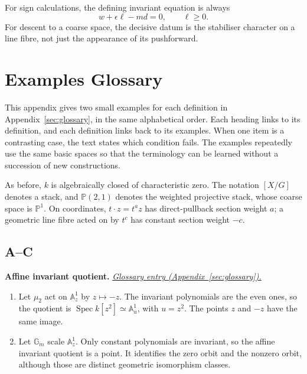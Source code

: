 \documentclass[11pt,a4paper]{article}
\numberwithin{equation}{section}
\theoremstyle{definition}
\newcommand{\A}{\mathbb A}
\newcommand{\PP}{\mathbb P}
\newcommand{\Gm}{\mathbb G_m}
\newcommand{\Spec}{\operatorname{Spec}}
\begin{document}
For sign calculations, the defining invariant equation is always
\[
 w+\epsilon\ell-md=0,\qquad \ell\ge0.
\]
For descent to a coarse space, the decisive datum is the stabiliser
character on a line fibre, not just the appearance of its pushforward.

\clearpage
\section{Examples Glossary}
\label{sec:examples-glossary}

This appendix gives two small examples for each definition in
Appendix~\ref{sec:glossary}, in the same alphabetical order. Each heading
links to its definition, and each definition links back to its examples.
When one item is a contrasting case, the text states which condition
fails. The examples repeatedly use the same basic spaces so that the
terminology can be learned without a succession of new constructions.

As before, $k$ is algebraically closed of characteristic zero. The
notation $[X/G]$ denotes a stack, and $\PP(2,1)$ denotes the weighted
projective stack, whose coarse space is $\PP^1$. On coordinates,
$t\cdot z=t^a z$ has direct-pullback section weight $a$; a geometric
line fibre acted on by $t^c$ has constant section weight $-c$.

\newcommand{\examplegloss}[3]{%
  \par\medskip\Needspace{5\baselineskip}%
  \phantomsection\label{examples:#1}%
  \noindent\textbf{#2.}\quad
  \hyperref[gloss:#1]{\textit{Glossary entry (Appendix~\ref*{sec:glossary}).}}\par
  #3\par}

\subsection*{A--C}

\examplegloss{affine-invariant-quotient}{Affine invariant quotient}{
\begin{enumerate}[label=(\arabic*),leftmargin=*,itemsep=2pt,topsep=3pt]
\item Let $\mu_2$ act on $\A^1_z$ by $z\mapsto-z$. The invariant polynomials are the even ones, so the quotient is $\Spec k[z^2]\simeq\A^1_u$, with $u=z^2$. The points $z$ and $-z$ have the same image.
\item Let $\Gm$ scale $\A^1_z$. Only constant polynomials are invariant, so the affine invariant quotient is a point. It identifies the zero orbit and the nonzero orbit, although those are distinct geometric isomorphism classes.
\end{enumerate}}
\end{document}
